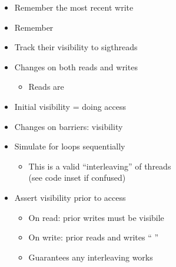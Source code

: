 \begin{minipage}[t]{0.48\textwidth}\fixminipage
\vspace{-6mm}
\vspace{6mm}


\begin{itemize}
  \item Remember the most recent write
  \item Remember 
  \item Track their visibility to sigthreads
\end{itemize}

\begin{itemize}
  \item Changes on both reads and writes
  \begin{itemize}
    \item Reads are 
  \end{itemize}
  \item Initial visibility =  doing access
  \item Changes on barriers: visibility 
\end{itemize}

\begin{itemize}
  \item Simulate for loops sequentially
  \begin{itemize}
    \item This is a valid ``interleaving'' of threads\\
    (see code inset if confused)
  \end{itemize}
  \item Assert visibility prior to access
  \begin{itemize}
    \item On read: prior writes must be visibile
    \item On write: prior reads and writes `` ''
    \item Guarantees any interleaving works
  \end{itemize}
\end{itemize}
\end{minipage}
\hfill
